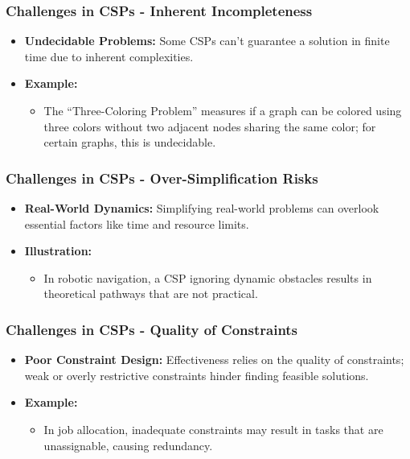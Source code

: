 \documentclass[aspectratio=169]{beamer}
\begin{document}
\begin{frame}[fragile]
    \frametitle{Challenges in CSPs - Inherent Incompleteness}
    \begin{itemize}
        \item \textbf{Undecidable Problems:} Some CSPs can't guarantee a solution in finite time due to inherent complexities.
        \item \textbf{Example:} 
        \begin{itemize}
            \item The “Three-Coloring Problem” measures if a graph can be colored using three colors without two adjacent nodes sharing the same color; for certain graphs, this is undecidable.
        \end{itemize}
    \end{itemize}
\end{frame}

\begin{frame}[fragile]
    \frametitle{Challenges in CSPs - Over-Simplification Risks}
    \begin{itemize}
        \item \textbf{Real-World Dynamics:} Simplifying real-world problems can overlook essential factors like time and resource limits.
        \item \textbf{Illustration:} 
        \begin{itemize}
            \item In robotic navigation, a CSP ignoring dynamic obstacles results in theoretical pathways that are not practical.
        \end{itemize}
    \end{itemize}
\end{frame}

\begin{frame}[fragile]
    \frametitle{Challenges in CSPs - Quality of Constraints}
    \begin{itemize}
        \item \textbf{Poor Constraint Design:} Effectiveness relies on the quality of constraints; weak or overly restrictive constraints hinder finding feasible solutions.
        \item \textbf{Example:} 
        \begin{itemize}
            \item In job allocation, inadequate constraints may result in tasks that are unassignable, causing redundancy.
        \end{itemize}
    \end{itemize}
\end{frame}
\end{document}
